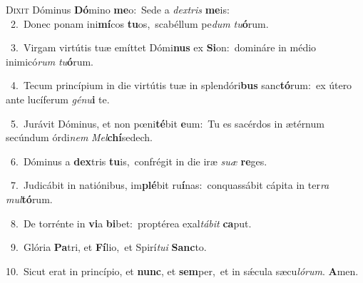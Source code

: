 \lettrine{\initial\textcolor{\initialcolor}{D}}{ixit} Dóminus \textbf{Dó}\-mino \textbf{me}\-o:~\star Sede a \textit{dex}\-\textit{tris} \textbf{me}\-is:\\
{\numbfont\textcolor{\numbcolor}{~2.}}~Donec ponam ini\-\textbf{mí}\-cos \textbf{tu}\-os,~\star scabéllum pe\textit{dum} \textit{tu}\-\textbf{ó}rum.\par
{\numbfont\textcolor{\numbcolor}{~3.}}~Virgam virtútis tuæ emíttet Dómi\textbf{nus} ex \textbf{Si}\-on:~\star domináre in médio inimicó\textit{rum} \textit{tu}\-\textbf{ó}rum.\par
{\numbfont\textcolor{\numbcolor}{~4.}}~Tecum princípium in die virtútis tuæ in splendóri\textbf{bus} sanc\-\textbf{tó}\-rum:~\star ex útero ante lucíferum \textit{gé}\-\textit{nu}\textbf{i} te.\par
{\numbfont\textcolor{\numbcolor}{~5.}}~Jurávit Dóminus, et non pœni\-\textbf{té}\-bit \textbf{e}\-um:~\star Tu es sacérdos in ætérnum secúndum órdi\textit{nem} \textit{Mel}\-\textbf{chí}sedech.\par
{\numbfont\textcolor{\numbcolor}{~6.}}~Dóminus a \textbf{dex}\-tris \textbf{tu}\-is,~\star confrégit in die iræ \textit{su}\-\textit{æ} \textbf{re}\-ges.\par
{\numbfont\textcolor{\numbcolor}{~7.}}~Judicábit in natiónibus, im\-\textbf{plé}\-bit ru\-\textbf{í}\-nas:~\star conquassábit cápita in ter\textit{ra} \textit{mul}\-\textbf{tó}rum.\par
{\numbfont\textcolor{\numbcolor}{~8.}}~De torrénte in \textbf{vi}\-a \textbf{bi}\-bet:~\star proptérea exal\-\textit{tá}\-\textit{bit} \textbf{ca}\-put.\par
{\numbfont\textcolor{\numbcolor}{~9.}}~Glória \textbf{Pa}\-tri, et \textbf{Fí}\-lio,~\star et Spirí\-\textit{tu}\-\textit{i} \textbf{Sanc}\-to.\par
{\numbfont\textcolor{\numbcolor}{10.}}~Sicut erat in princípio, et \textbf{nunc}\-, et \textbf{sem}\-per,~\star et in sǽcula sæcu\-\textit{ló}\-\textit{rum}. \textbf{A}\-men.\par
